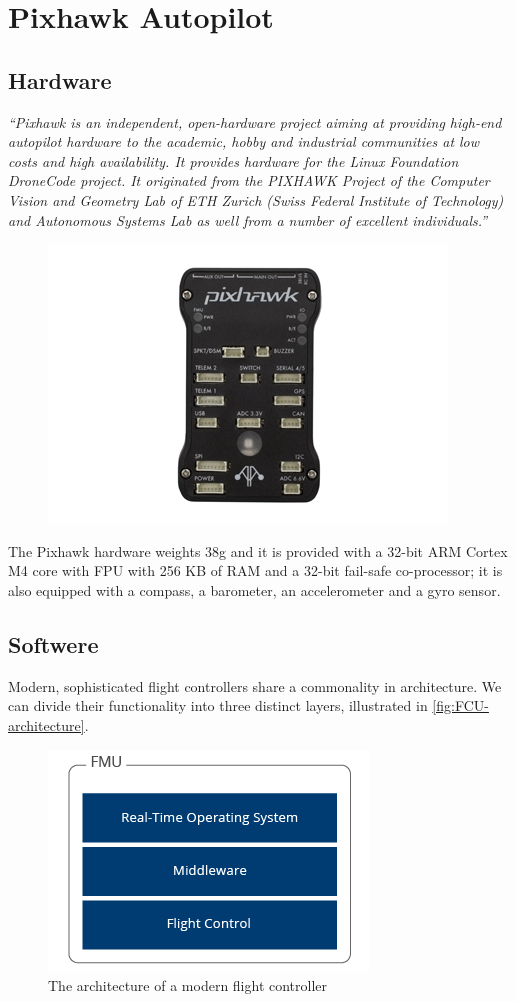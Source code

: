 
\chapter{Pixhawk Autopilot} %
\label{appendix:pixhawk_flight_controller}
\section{Hardware} %
\label{sub:hardware}
\textit{“Pixhawk is an independent, open-hardware project aiming at providing high-end autopilot hardware to the academic, hobby and industrial communities at low costs and high availability. It provides hardware for the Linux Foundation DroneCode project. It originated from the PIXHAWK Project of the Computer Vision and Geometry Lab of ETH Zurich (Swiss Federal Institute of Technology) and Autonomous Systems Lab as well from a number of excellent individuals.”} \cite{Pixhawk}
\begin{figure}[ht]
    \centering
    \includegraphics[width=.6\textwidth]{figures/A2/pixhawk.jpg}
    \caption{}
    \label{fig:Pixhawk Flight Controller}
\end{figure}

The Pixhawk hardware weights 38g and it is provided with a 32-bit ARM Cortex M4 core with FPU with 256 KB of RAM and a 32-bit fail-safe co-processor; it is also equipped with a compass, a barometer, an accelerometer and a gyro sensor. 

\section{Softwere} %
\label{sub:softwere}
Modern, sophisticated flight controllers share a commonality in architecture. We can divide their functionality into three distinct layers, illustrated in \autoref{fig:FCU-architecture}.
\begin{figure}[ht]
    \centering
    \includegraphics[width=.5\textwidth]{figures/A2/flightControllerArchitecture.png}
    \caption{The architecture of a modern flight controller}
    \label{fig:FCU-architecture}
\end{figure}
